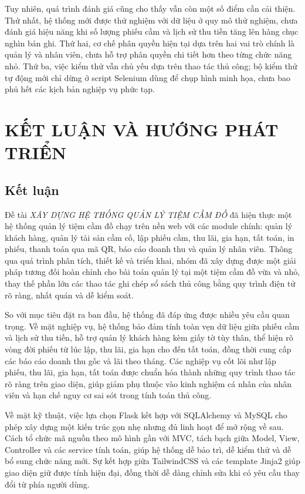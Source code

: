 \documentclass[13pt,a4paper]{extreport}
\newcommand{\TenDeTai}{XÂY DỰNG HỆ THỐNG QUẢN LÝ TIỆM CẦM ĐỒ}
\begin{document}
Tuy nhiên, quá trình đánh giá cũng cho thấy vẫn còn một số điểm cần cải thiện. Thứ nhất, hệ thống mới được thử nghiệm với dữ liệu ở quy mô thử nghiệm, chưa đánh giá hiệu năng khi số lượng phiếu cầm và lịch sử thu tiền tăng lên hàng chục nghìn bản ghi. Thứ hai, cơ chế phân quyền hiện tại dựa trên hai vai trò chính là quản lý và nhân viên, chưa hỗ trợ phân quyền chi tiết hơn theo từng chức năng nhỏ. Thứ ba, việc kiểm thử vẫn chủ yếu dựa trên thao tác thủ công; bộ kiểm thử tự động mới chỉ dừng ở script Selenium dùng để chụp hình minh họa, chưa bao phủ hết các kịch bản nghiệp vụ phức tạp.

\chapter{KẾT LUẬN VÀ HƯỚNG PHÁT TRIỂN}

\section{Kết luận}

Đề tài \emph{\TenDeTai} đã hiện thực một hệ thống quản lý tiệm cầm đồ chạy trên nền web với các module chính: quản lý khách hàng, quản lý tài sản cầm cố, lập phiếu cầm, thu lãi, gia hạn, tất toán, in phiếu, thanh toán qua mã QR, báo cáo doanh thu và quản lý nhân viên. Thông qua quá trình phân tích, thiết kế và triển khai, nhóm đã xây dựng được một giải pháp tương đối hoàn chỉnh cho bài toán quản lý tại một tiệm cầm đồ vừa và nhỏ, thay thế phần lớn các thao tác ghi chép sổ sách thủ công bằng quy trình điện tử rõ ràng, nhất quán và dễ kiểm soát.

So với mục tiêu đặt ra ban đầu, hệ thống đã đáp ứng được nhiều yêu cầu quan trọng. Về mặt nghiệp vụ, hệ thống bảo đảm tính toàn vẹn dữ liệu giữa phiếu cầm và lịch sử thu tiền, hỗ trợ quản lý khách hàng kèm giấy tờ tùy thân, thể hiện rõ vòng đời phiếu từ lúc lập, thu lãi, gia hạn cho đến tất toán, đồng thời cung cấp các báo cáo doanh thu gốc và lãi theo tháng. Các nghiệp vụ cốt lõi như lập phiếu, thu lãi, gia hạn, tất toán được chuẩn hóa thành những quy trình thao tác rõ ràng trên giao diện, giúp giảm phụ thuộc vào kinh nghiệm cá nhân của nhân viên và hạn chế nguy cơ sai sót trong tính toán thủ công.

Về mặt kỹ thuật, việc lựa chọn Flask kết hợp với SQLAlchemy và MySQL cho phép xây dựng một kiến trúc gọn nhẹ nhưng đủ linh hoạt để mở rộng về sau. Cách tổ chức mã nguồn theo mô hình gần với MVC, tách bạch giữa Model, View, Controller và các service tính toán, giúp hệ thống dễ bảo trì, dễ kiểm thử và dễ bổ sung chức năng mới. Sự kết hợp giữa TailwindCSS và các template Jinja2 giúp giao diện giữ được tính hiện đại, đồng thời dễ dàng chỉnh sửa khi có yêu cầu thay đổi từ phía người dùng.
\end{document}
